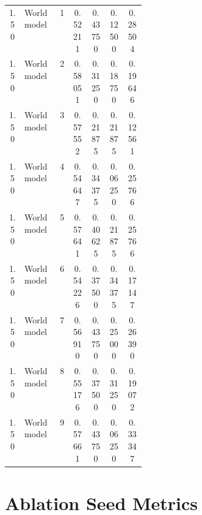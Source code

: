 \documentclass{article}
\begin{document}
\begin{center}
\begin{longtable}{cp{0.26\linewidth}ccccc}
1.50 & World model & 1 & 0.52211 & 0.43750 & 0.12500 & 0.28504\\
1.50 & World model & 2 & 0.58051 & 0.31250 & 0.18750 & 0.19646\\
1.50 & World model & 3 & 0.57552 & 0.21875 & 0.21875 & 0.12561\\
1.50 & World model & 4 & 0.54647 & 0.34375 & 0.06250 & 0.25766\\
1.50 & World model & 5 & 0.57641 & 0.40625 & 0.21875 & 0.25766\\
1.50 & World model & 6 & 0.54226 & 0.37500 & 0.34375 & 0.17147\\
1.50 & World model & 7 & 0.56910 & 0.43750 & 0.25000 & 0.26390\\
1.50 & World model & 8 & 0.55176 & 0.37500 & 0.31250 & 0.19072\\
1.50 & World model & 9 & 0.57661 & 0.43750 & 0.06250 & 0.33347\\
\bottomrule
\end{longtable}
\normalsize
\end{center}

\section{Ablation Seed Metrics}
\end{document}
